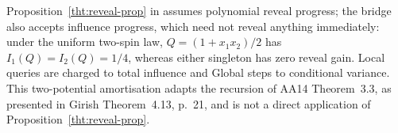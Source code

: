 \begin{remark}
\label{ian:bridge-versus-reveal}
Proposition~\ref{tht:reveal-prop} in
assumes polynomial reveal progress; the bridge also accepts influence
progress, which need not reveal anything immediately: under the
uniform two-spin law, \(Q=(1+x_1x_2)/2\) has \(I_1(Q)=I_2(Q)=1/4\),
whereas either singleton has zero reveal gain. Local queries are
charged to total influence and Global steps to conditional variance.
This two-potential amortisation adapts the recursion of AA14
Theorem~3.3, as presented in Girish Theorem~4.13, p.~21, and is not a
direct application of Proposition~\ref{tht:reveal-prop}.
\end{remark}
